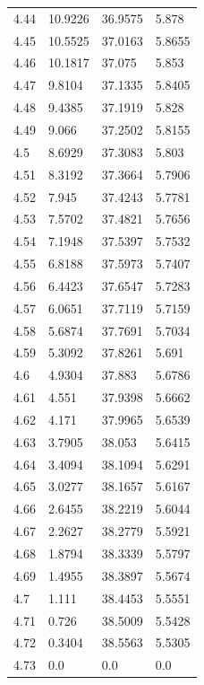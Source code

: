 \begin{tabular}{llll}
4.44 & 10.9226 & 36.9575 & 5.878 \\
4.45 & 10.5525 & 37.0163 & 5.8655 \\
4.46 & 10.1817 & 37.075 & 5.853 \\
4.47 & 9.8104 & 37.1335 & 5.8405 \\
4.48 & 9.4385 & 37.1919 & 5.828 \\
4.49 & 9.066 & 37.2502 & 5.8155 \\
4.5 & 8.6929 & 37.3083 & 5.803 \\
4.51 & 8.3192 & 37.3664 & 5.7906 \\
4.52 & 7.945 & 37.4243 & 5.7781 \\
4.53 & 7.5702 & 37.4821 & 5.7656 \\
4.54 & 7.1948 & 37.5397 & 5.7532 \\
4.55 & 6.8188 & 37.5973 & 5.7407 \\
4.56 & 6.4423 & 37.6547 & 5.7283 \\
4.57 & 6.0651 & 37.7119 & 5.7159 \\
4.58 & 5.6874 & 37.7691 & 5.7034 \\
4.59 & 5.3092 & 37.8261 & 5.691 \\
4.6 & 4.9304 & 37.883 & 5.6786 \\
4.61 & 4.551 & 37.9398 & 5.6662 \\
4.62 & 4.171 & 37.9965 & 5.6539 \\
4.63 & 3.7905 & 38.053 & 5.6415 \\
4.64 & 3.4094 & 38.1094 & 5.6291 \\
4.65 & 3.0277 & 38.1657 & 5.6167 \\
4.66 & 2.6455 & 38.2219 & 5.6044 \\
4.67 & 2.2627 & 38.2779 & 5.5921 \\
4.68 & 1.8794 & 38.3339 & 5.5797 \\
4.69 & 1.4955 & 38.3897 & 5.5674 \\
4.7 & 1.111 & 38.4453 & 5.5551 \\
4.71 & 0.726 & 38.5009 & 5.5428 \\
4.72 & 0.3404 & 38.5563 & 5.5305 \\
4.73 & 0.0 & 0.0 & 0.0 \\
\bottomrule
\end{tabular}
